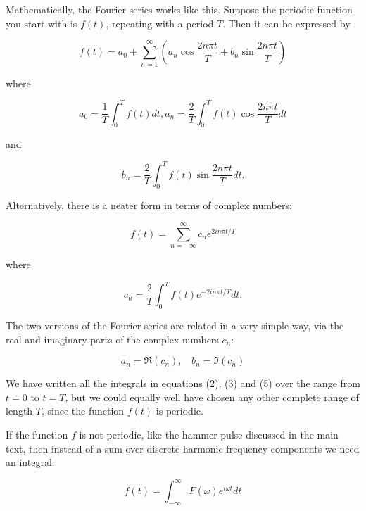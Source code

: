   Mathematically, the Fourier series works like this. Suppose the periodic 
  function you start with is $f(t)$, repeating with a period $T$. Then it can 
  be expressed by 

  \begin{equation*}f(t)=a_0+\sum_{n=1}^\infty \left( a_n \cos \dfrac{2n\pi 
  t}{T} + b_n \sin \dfrac{2n\pi t}{T} \right) \tag{1}\end{equation*} 

  \noindent{}where 

  \begin{equation*}a_0=\dfrac{1}{T}\int_0^T f(t) dt, a_n=\dfrac{2}{T}\int_0^T 
  f(t)\cos \dfrac{2n\pi t}{T} dt \tag{2}\end{equation*} 

  \noindent{}and 

  \begin{equation*}b_n=\dfrac{2}{T}\int_0^T f(t)\sin \dfrac{2n\pi t}{T} dt. 
  \tag{3}\end{equation*} 

  Alternatively, there is a neater form in terms of complex numbers: 

  \begin{equation*}f(t)=\sum_{n=-\infty}^\infty c_n e^{2in\pi t/T} 
  \tag{4}\end{equation*} 

  \noindent{}where 

  \begin{equation*}c_n=\dfrac{2}{T}\int_0^T f(t)e^{-2in\pi t/T} dt. 
  \tag{5}\end{equation*} 

  The two versions of the Fourier series are related in a very simple way, via 
  the real and imaginary parts of the complex numbers $c_n$: 

  \begin{equation*}a_n=\Re (c_n), \mathrm{~~~~}b_n=\Im (c_n) 
  \tag{6}\end{equation*} 

  We have written all the integrals in equations (2), (3) and (5) over the 
  range from $t=0$ to $t=T$, but we could equally well have chosen any other 
  complete range of length $T$, since the function $f(t)$ is periodic. 

  If the function $f$ is not periodic, like the hammer pulse discussed in the 
  main text, then instead of a sum over discrete harmonic frequency components 
  we need an integral: 

  \begin{equation*}f(t)=\int_{-\infty}^\infty F(\omega) e^{i \omega t} dt 
  \tag{7}\end{equation*} 

